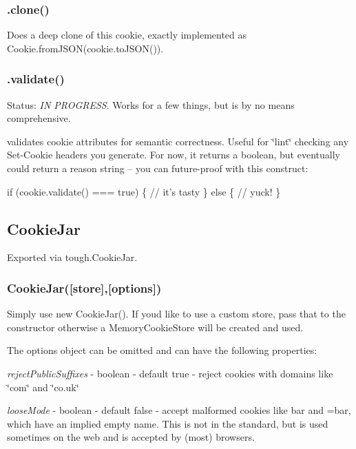 \subsubsection*{{\ttfamily .clone()}}

Does a deep clone of this cookie, exactly implemented as {\ttfamily Cookie.\+from\+J\+S\+ON(cookie.\+to\+J\+S\+O\+N())}.

\subsubsection*{{\ttfamily .validate()}}

Status\+: {\itshape IN P\+R\+O\+G\+R\+E\+SS}. Works for a few things, but is by no means comprehensive.

validates cookie attributes for semantic correctness. Useful for \char`\"{}lint\char`\"{} checking any Set-\/\+Cookie headers you generate. For now, it returns a boolean, but eventually could return a reason string -- you can future-\/proof with this construct\+:


\begin{DoxyCode}
if (cookie.validate() === true) \{
  // it's tasty
\} else \{
  // yuck!
\}
\end{DoxyCode}


\subsection*{Cookie\+Jar}

Exported via {\ttfamily tough.\+Cookie\+Jar}.

\subsubsection*{{\ttfamily Cookie\+Jar(\mbox{[}store\mbox{]},\mbox{[}options\mbox{]})}}

Simply use {\ttfamily new Cookie\+Jar()}. If you\textquotesingle{}d like to use a custom store, pass that to the constructor otherwise a {\ttfamily Memory\+Cookie\+Store} will be created and used.

The {\ttfamily options} object can be omitted and can have the following properties\+:


\begin{DoxyItemize}
\item {\itshape reject\+Public\+Suffixes} -\/ boolean -\/ default {\ttfamily true} -\/ reject cookies with domains like \char`\"{}com\char`\"{} and \char`\"{}co.\+uk\char`\"{}
\item {\itshape loose\+Mode} -\/ boolean -\/ default {\ttfamily false} -\/ accept malformed cookies like {\ttfamily bar} and {\ttfamily =bar}, which have an implied empty name. This is not in the standard, but is used sometimes on the web and is accepted by (most) browsers.
\end{DoxyItemize}

